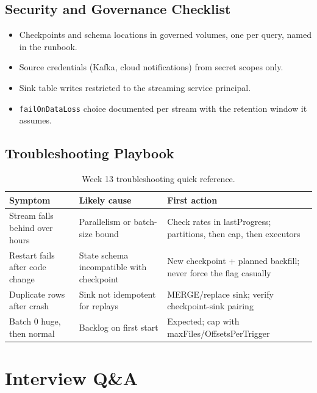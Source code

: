 \subsection{Security and Governance Checklist}
\begin{itemize}
    \item Checkpoints and schema locations in governed volumes, one per query, named in the runbook.
    \item Source credentials (Kafka, cloud notifications) from secret scopes only.
    \item Sink table writes restricted to the streaming service principal.
    \item \texttt{failOnDataLoss} choice documented per stream with the retention window it assumes.
\end{itemize}

\subsection{Troubleshooting Playbook}
\begin{table}[H]
\centering
\small
\begin{tabular}{@{}p{3.6cm}p{4.2cm}p{4.8cm}@{}}
\toprule
\textbf{Symptom} & \textbf{Likely cause} & \textbf{First action} \\
\midrule
Stream falls behind over hours & Parallelism or batch-size bound & Check rates in lastProgress; partitions, then cap, then executors \\
Restart fails after code change & State schema incompatible with checkpoint & New checkpoint + planned backfill; never force the flag casually \\
Duplicate rows after crash & Sink not idempotent for replays & MERGE/replace sink; verify checkpoint-sink pairing \\
Batch 0 huge, then normal & Backlog on first start & Expected; cap with maxFiles/OffsetsPerTrigger \\
\bottomrule
\end{tabular}
\caption{Week 13 troubleshooting quick reference.}
\label{tab:ch13-trouble}
\end{table}

\section{Interview Q\&A}
